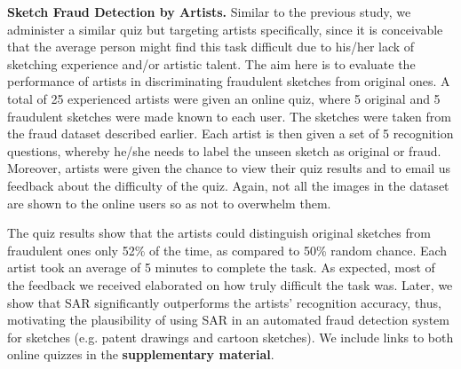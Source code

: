 \noindent\textbf{Sketch Fraud Detection by Artists.} Similar to the previous study, we administer a similar quiz but targeting artists specifically, since it is conceivable that the average person might find this task difficult due to his/her lack of sketching experience and/or artistic talent. The aim here is to evaluate the performance of artists in discriminating fraudulent sketches from original ones. A total of 25 experienced artists were given an online quiz, where 5 original and 5 fraudulent sketches were made known to each user. The sketches were taken from the fraud dataset described earlier. Each artist is then given a set of 5 recognition questions, whereby he/she needs to label the unseen sketch as original or fraud. Moreover, artists were given the chance to view their quiz results and to email us feedback about the difficulty of the quiz. Again, not all the images in the dataset are shown to the online users so as not to overwhelm them.

The quiz results show that the artists could distinguish original sketches from fraudulent ones only 52\% of the time, as compared to 50\% random chance. Each artist took an average of 5 minutes to complete the task. As expected, most of the feedback we received elaborated on how truly difficult the task was. Later, we show that SAR significantly outperforms the artists' recognition accuracy, thus, motivating the plausibility of using SAR in an automated fraud detection system for sketches (e.g. patent drawings and cartoon sketches). We include links to both online quizzes in the \textbf{supplementary material}.
